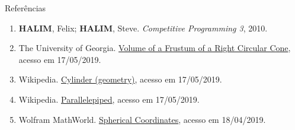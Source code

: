 \begin{frame}[fragile]{Referências}

    \begin{enumerate}
        \item \textbf{HALIM}, Felix; \textbf{HALIM}, Steve. \textit{Competitive Programming 3}, 2010.

        \item The University of Georgia. \href{http://jwilson.coe.uga.edu/emt725/Frustum/Frustum.cone.html}{Volume of a Frustum of a Right Circular Cone}, acesso em 17/05/2019.

        \item Wikipedia. \href{https://en.wikipedia.org/wiki/Cylinder_(geometry)}{Cylinder (geometry)}, acesso em 17/05/2019.

        \item Wikipedia. \href{https://en.wikipedia.org/wiki/Parallelepiped}{Parallelepiped}, acesso em 17/05/2019.

        \item Wolfram MathWorld. \href{http://mathworld.wolfram.com/SphericalCoordinates.html}{Spherical Coordinates}, acesso em 18/04/2019.
    \end{enumerate}

\end{frame}
